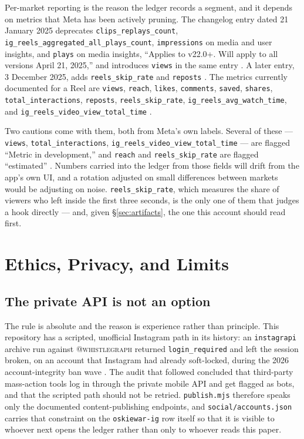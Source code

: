\documentclass[10pt,letterpaper,twocolumn]{article}
\newcommand{\code}[1]{\texttt{#1}}
\begin{document}
Per-market reporting is the reason the ledger records a segment, and it depends
on metrics that Meta has been actively pruning. The changelog entry dated 21
January 2025 deprecates \code{clips\_replays\_count},
\code{ig\_reels\_aggregated\_all\_plays\_count}, \code{impressions} on media and
user insights, and \code{plays} on media insights, ``Applies to v22.0+. Will
apply to all versions April 21, 2025,'' and introduces \code{views} in the same
entry \cite{metaChangelog}. A later entry, 3 December 2025, adds
\code{reels\_skip\_rate} and \code{reposts} \cite{metaChangelog}. The metrics
currently documented for a Reel are \code{views}, \code{reach}, \code{likes},
\code{comments}, \code{saved}, \code{shares}, \code{total\_interactions},
\code{reposts}, \code{reels\_skip\_rate}, \code{ig\_reels\_avg\_watch\_time},
and \code{ig\_reels\_video\_view\_total\_time} \cite{metaInsights}.

Two cautions come with them, both from Meta's own labels. Several of these ---
\code{views}, \code{total\_interactions}, \code{ig\_reels\_video\_view\_total\_time}
--- are flagged ``Metric in development,'' and \code{reach} and
\code{reels\_skip\_rate} are flagged ``estimated'' \cite{metaInsights}. Numbers
carried into the ledger from those fields will drift from the app's own UI, and
a rotation adjusted on small differences between markets would be adjusting on
noise. \code{reels\_skip\_rate}, which measures the share of viewers who left
inside the first three seconds, is the only one of them that judges a hook
directly --- and, given \S\ref{sec:artifacts}, the one this account should read
first.

\section{Ethics, Privacy, and Limits}

\subsection{The private API is not an option}

The rule is absolute and the reason is experience rather than principle. This
repository has a scripted, unofficial Instagram path in its history: an
\code{instagrapi} archive run against \textsc{@whistlegraph} returned
\code{login\_required} and left the session broken, on an account that
Instagram had already soft-locked, during the 2026 account-integrity ban wave
\cite{acgridpruning}. The audit that followed concluded that third-party
mass-action tools log in through the private mobile API and get flagged as bots,
and that the scripted path should not be retried. \code{publish.mjs} therefore
speaks only the documented content-publishing endpoints, and
\code{social/accounts.json} carries that constraint on the
\code{oskiewar-ig} row itself \cite{acsocial} so that it is visible to whoever
next opens the ledger rather than only to whoever reads this paper.
\end{document}
